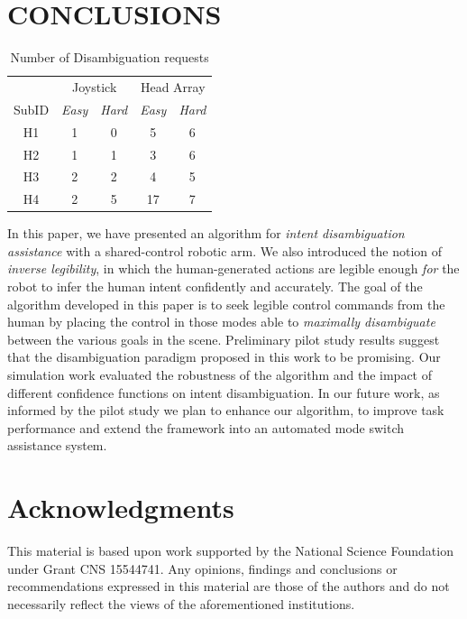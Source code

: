 \documentclass[conference]{IEEEtran}
\begin{document}
\section{CONCLUSIONS}\label{DC}
\begin{table}[t]
	\centering
	\begin{tabular}{ccccc}
		\toprule
		&\multicolumn{2}{c}{Joystick}
		&
		\multicolumn{2}{c}{Head Array} \\\cmidrule(r){2-3}\cmidrule(l){4-5}
		SubID &\textit{Easy}& \textit{Hard}    & \textit{Easy} &\textit{Hard}      \\
		\bottomrule
		H1 &1& 0   & 5 & 6  \\
		\bottomrule
		H2 &1& 1    & 3 & 6      \\
		\bottomrule
		H3 &2& 2    & 4 &5    \\
		\bottomrule
		H4 &2& 5    & 17 &7   \\
		\bottomrule
	\end{tabular}
	\vspace{.2cm}
	\caption{Number of Disambiguation requests}
	\label{ONDEMAND}
\end{table}
In this paper, we have presented an algorithm for \textit{intent disambiguation assistance} with a shared-control robotic arm. We also introduced the notion of \textit{inverse legibility}, in which the human-generated actions are legible enough \textit{for} the robot to infer the human intent confidently and accurately. The goal of the algorithm developed in this paper is to seek legible control commands from the human by placing the control in those modes able to \textit{maximally disambiguate} between the various goals in the scene. Preliminary pilot study results  suggest that the disambiguation paradigm proposed in this work to be promising. Our simulation work evaluated the robustness of the algorithm and the impact of different confidence functions on intent disambiguation. In our future work, as informed by the pilot study we plan to enhance our algorithm, to improve task performance and extend the framework into an automated mode switch assistance system. 

\section*{Acknowledgments}
This material is based upon work supported by the National Science Foundation under Grant CNS 15544741. Any opinions, findings and conclusions or
recommendations expressed in this material are those of the authors and do
not necessarily reflect the views of the aforementioned institutions.
%
\end{document}
